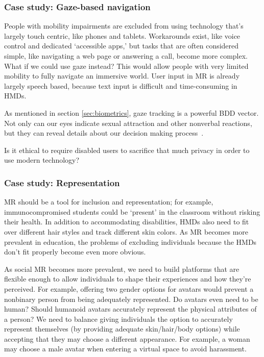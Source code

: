 \subsubsection{Case study: Gaze-based navigation}

People with mobility impairments are excluded from using technology that's largely touch centric, like phones and tablets. Workarounds exist, like voice control and dedicated `accessible apps,' but tasks that are often considered simple, like navigating a web page or answering a call, become more complex. What if we could use gaze instead? This would allow people with very limited mobility to fully navigate an immersive world. User input in MR is already largely speech based, because text input is difficult and time-consuming in HMDs.

As mentioned in section \ref{sec:biometrics}, gaze tracking is a powerful BDD vector. Not only can our eyes indicate sexual attraction and other nonverbal reactions, but they can reveal details about our decision making process~\cite{costandi}.

Is it ethical to require disabled users to sacrifice that much privacy in order to use modern technology?


\subsubsection{Case study: Representation}

MR should be a tool for inclusion and representation; for example, immunocompromised students could be `present' in the classroom without risking their health.  In addition to accommodating disabilities, HMDs also need to fit over different hair styles and track different skin colors. As MR becomes more prevalent in education, the problems of excluding individuals because the HMDs don't fit properly become even more obvious.

As social MR becomes more prevalent, we need to build platforms that are flexible enough to allow individuals to shape their experiences and how they're perceived. For example, offering two gender options for avatars would prevent a nonbinary person from being adequately represented. Do avatars even need to be human? Should humanoid avatars accurately represent the physical attributes of a person? We need to balance giving individuals the option to accurately represent themselves (by providing adequate skin/hair/body options) while accepting that they may choose a different appearance. For example, a woman may choose a male avatar when entering a virtual space to avoid harassment.

